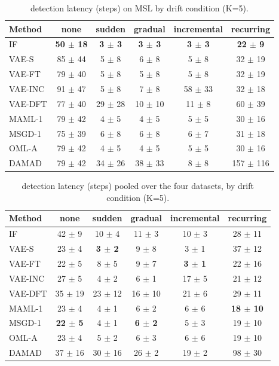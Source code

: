 \begin{table}[t]
\centering
\small
\caption{detection latency (steps) on MSL by drift condition (K=5).}
\label{tab:drift_latency_mean_msl}
\begin{tabular}{lccccc}
\toprule
Method & none & sudden & gradual & incremental & recurring \\
\midrule
IF & \textbf{50 $\pm$ 18} & \textbf{3 $\pm$ 3} & \textbf{3 $\pm$ 3} & \textbf{3 $\pm$ 3} & \textbf{22 $\pm$ 9} \\
VAE-S & 85 $\pm$ 44 & 5 $\pm$ 8 & 6 $\pm$ 8 & 5 $\pm$ 8 & 32 $\pm$ 19 \\
VAE-FT & 79 $\pm$ 40 & 5 $\pm$ 8 & 5 $\pm$ 8 & 5 $\pm$ 8 & 32 $\pm$ 19 \\
VAE-INC & 91 $\pm$ 47 & 5 $\pm$ 8 & 7 $\pm$ 8 & 58 $\pm$ 33 & 32 $\pm$ 18 \\
VAE-DFT & 77 $\pm$ 40 & 29 $\pm$ 28 & 10 $\pm$ 10 & 11 $\pm$ 8 & 60 $\pm$ 39 \\
MAML-1 & 79 $\pm$ 42 & 4 $\pm$ 5 & 4 $\pm$ 5 & 5 $\pm$ 5 & 30 $\pm$ 16 \\
MSGD-1 & 75 $\pm$ 39 & 6 $\pm$ 8 & 6 $\pm$ 8 & 6 $\pm$ 7 & 31 $\pm$ 18 \\
OML-A & 79 $\pm$ 42 & 4 $\pm$ 5 & 4 $\pm$ 5 & 5 $\pm$ 5 & 30 $\pm$ 16 \\
DAMAD & 79 $\pm$ 42 & 34 $\pm$ 26 & 38 $\pm$ 33 & 8 $\pm$ 8 & 157 $\pm$ 116 \\
\bottomrule
\end{tabular}
\end{table}

\begin{table}[t]
\centering
\small
\caption{detection latency (steps) pooled over the four datasets, by drift condition (K=5).}
\label{tab:drift_latency_mean_all}
\begin{tabular}{lccccc}
\toprule
Method & none & sudden & gradual & incremental & recurring \\
\midrule
IF & 42 $\pm$ 9 & 10 $\pm$ 4 & 11 $\pm$ 3 & 10 $\pm$ 3 & 28 $\pm$ 11 \\
VAE-S & 23 $\pm$ 4 & \textbf{3 $\pm$ 2} & 9 $\pm$ 8 & 3 $\pm$ 1 & 37 $\pm$ 12 \\
VAE-FT & 22 $\pm$ 5 & 8 $\pm$ 5 & 9 $\pm$ 7 & \textbf{3 $\pm$ 1} & 22 $\pm$ 16 \\
VAE-INC & 27 $\pm$ 5 & 4 $\pm$ 2 & 6 $\pm$ 1 & 17 $\pm$ 5 & 21 $\pm$ 12 \\
VAE-DFT & 35 $\pm$ 19 & 23 $\pm$ 12 & 16 $\pm$ 10 & 21 $\pm$ 6 & 29 $\pm$ 11 \\
MAML-1 & 23 $\pm$ 4 & 4 $\pm$ 1 & 6 $\pm$ 2 & 6 $\pm$ 6 & \textbf{18 $\pm$ 10} \\
MSGD-1 & \textbf{22 $\pm$ 5} & 4 $\pm$ 1 & \textbf{6 $\pm$ 2} & 5 $\pm$ 3 & 19 $\pm$ 10 \\
OML-A & 23 $\pm$ 4 & 5 $\pm$ 2 & 6 $\pm$ 3 & 6 $\pm$ 6 & 19 $\pm$ 10 \\
DAMAD & 37 $\pm$ 16 & 30 $\pm$ 16 & 26 $\pm$ 2 & 19 $\pm$ 2 & 98 $\pm$ 30 \\
\bottomrule
\end{tabular}
\end{table}

